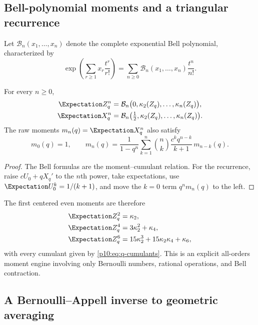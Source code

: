 \documentclass[11pt]{article}
\numberwithin{equation}{section}
\theoremstyle{definition}
\theoremstyle{remark}
\begin{document}
\subsection{Bell-polynomial moments and a triangular recurrence}

Let $\mathcal B_n(x_1,\ldots,x_n)$ denote the complete exponential Bell polynomial,
characterized by
\[
 \exp\left(\sum_{r\ge1}x_r\frac{t^r}{r!}\right)
 =\sum_{n\ge0}\mathcal B_n(x_1,\ldots,x_n)\frac{t^n}{n!}.
\]

\begin{corollary}
\label{p10:cor:bell-moments}
For every $n\ge0$,
\begin{align}
 \Expectation Z_q^n
 &=\mathcal B_n\bigl(0,\kappa_2(Z_q),\ldots,\kappa_n(Z_q)\bigr),  \label{p10:eq:centered-bell}\\
 \Expectation X_q^n
 &=\mathcal B_n\bigl(\tfrac12,\kappa_2(Z_q),\ldots,\kappa_n(Z_q)\bigr). \label{p10:eq:raw-bell}
\end{align}
The raw moments $m_n(q)=\Expectation X_q^n$ also satisfy
\begin{equation}
 m_0(q)=1,
 \qquad
 m_n(q)=\frac{1}{1-q^n}
 \sum_{k=1}^{n}\binom nk\frac{c^kq^{n-k}}{k+1}\,m_{n-k}(q).  \label{p10:eq:moment-recurrence}
\end{equation}
\end{corollary}

\begin{proof}
The Bell formulas are the moment--cumulant relation.  For the recurrence, raise
$cU_0+qX_q'$ to the $n$th power, take expectations, use $\Expectation U_0^k=1/(k+1)$, and move the
$k=0$ term $q^nm_n(q)$ to the left.
\end{proof}

The first centered even moments are therefore
\begin{align*}
 \Expectation Z_q^2&=\kappa_2,\\
 \Expectation Z_q^4&=3\kappa_2^2+\kappa_4,\\
 \Expectation Z_q^6&=15\kappa_2^3+15\kappa_2\kappa_4+\kappa_6,
\end{align*}
with every cumulant given by \eqref{p10:eq:q-cumulants}.  This is an explicit all-orders moment
engine involving only Bernoulli numbers, rational operations, and Bell contraction.

\subsection{A Bernoulli--Appell inverse to geometric averaging}
\end{document}
